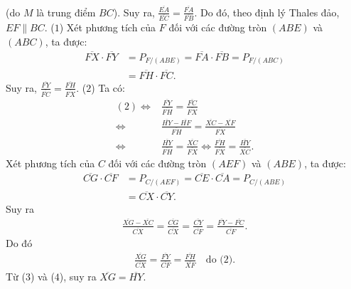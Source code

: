 \begin{multicols}{2}
\begin{align*}
	\end{align*}
	(do $M$ là trung điểm $BC$).
	\vskip 0.05cm
	Suy ra, $\frac{{\overline {EA} }}{{\overline {EC} }} = \frac{{\overline {FA} }}{{\overline {FB} }}$.  Do đó, theo định lý Thales đảo,  $EF \parallel BC$. \hfill         ($1$)
	\vskip 0.05cm
	Xét phương tích của $F$ đối với các đường tròn $(ABE)$ và $(ABC)$, ta được:
	\begin{align*}
		\overline {FX}  \cdot \overline {FY}  &= {P_{F/\left( {ABE} \right)}} = \overline {FA}  \cdot \overline {FB}  = {P_{F/\left( {ABC} \right)}} \\
		&= \overline {FH}  \cdot \overline {FC} .
	\end{align*}
	Suy ra, $\frac{{\overline {FY} }}{{\overline {FC} }} = \frac{{\overline {FH} }}{{\overline {FX} }}.$ \hfill ($2$)
	\vskip 0.05cm
	Ta có:
	\begin{align*}
		\left( 2 \right) \Leftrightarrow& \frac{{\overline {FY} }}{{\overline {FH} }} = \frac{{\overline {FC} }}{{\overline {FX} }} \\
		\Leftrightarrow &\frac{{\overline {HY}  - \overline {HF} }}{{\overline {FH} }} = \frac{{\overline {XC}  - \overline {XF} }}{{\overline {FX} }}\\ \Leftrightarrow &\frac{{\overline {HY} }}{{\overline {FH} }} = \frac{{\overline {XC} }}{{\overline {FX} }} \Leftrightarrow \frac{{\overline {FH} }}{{\overline {FX} }} = \frac{{\overline {HY} }}{{\overline {XC} }}. \tag{$3$}
	\end{align*}
	Xét phương tích của $C$ đối với các đường tròn $(AEF)$ và $(ABE)$, ta được:
	\begin{align*}
		\overline {CG}  \cdot \overline {CF}  &= {P_{C/\left( {AEF} \right)}} = \overline {CE}  \cdot \overline {CA}  = {P_{C/\left( {ABE} \right)}}\\
		& = \overline {CX}  \cdot \overline {CY} .
	\end{align*}
	Suy ra
	\begin{align*}
		\frac{{\overline {XG}  - \overline {XC} }}{{\overline {CX} }} = \frac{{\overline {CG} }}{{\overline {CX} }} = \frac{{\overline {CY} }}{{\overline {CF} }} = \frac{{\overline {FY}  - \overline {FC} }}{{\overline {CF} }}.
	\end{align*}
	Do đó
	\begin{align*}
		\frac{{\overline {XG} }}{{\overline {CX} }} = \frac{{\overline {FY} }}{{\overline {CF} }} = \frac{{\overline {FH} }}{{\overline {XF} }} \quad \text{do ($2$).} \tag{$4$}
	\end{align*}
	Từ ($3$) và ($4$), suy ra $\overline {XG}  = \overline {HY} .$

\end{multicols}
